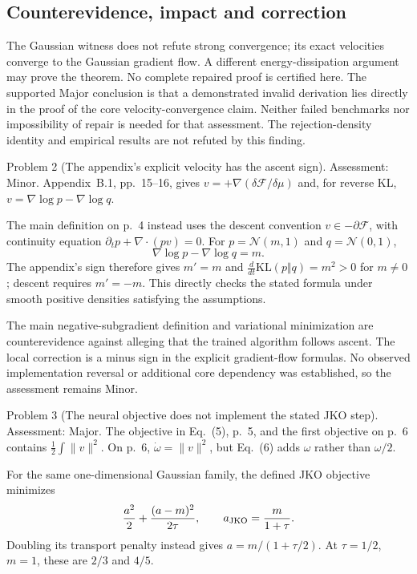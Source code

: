 \documentclass[10pt]{article}
\begin{document}
\subsection*{Counterevidence, impact and correction}
The Gaussian witness does not refute strong convergence; its exact velocities converge to the Gaussian gradient flow. A different energy-dissipation argument may prove the theorem. No complete repaired proof is certified here. The supported Major conclusion is that a demonstrated invalid derivation lies directly in the proof of the core velocity-convergence claim. Neither failed benchmarks nor impossibility of repair is needed for that assessment. The rejection-density identity and empirical results are not refuted by this finding.\par
Problem 2 (The appendix’s explicit velocity has the ascent sign).  Assessment: Minor. Appendix B.1, pp. 15–16, gives \(v=+\nabla(\delta\mathcal F/\delta\mu)\) and, for reverse KL, \(v=\nabla\log p-\nabla\log q\).\par
The main definition on p. 4 instead uses the descent convention \(v\in-\partial\mathcal F\), with continuity equation \(\partial_t p+\nabla\cdot(pv)=0\). For \(p=\mathcal N(m,1)\) and \(q=\mathcal N(0,1)\), \[\nabla\log p-\nabla\log q=m.\] The appendix’s sign therefore gives \(m'=m\) and \(\frac{d}{dt}\mathrm{KL}(p\Vert q)=m^2>0\) for \(m\ne0\); descent requires \(m'=-m\). This directly checks the stated formula under smooth positive densities satisfying the assumptions.\par
The main negative-subgradient definition and variational minimization are counterevidence against alleging that the trained algorithm follows ascent. The local correction is a minus sign in the explicit gradient-flow formulas. No observed implementation reversal or additional core dependency was established, so the assessment remains Minor.\par
Problem 3 (The neural objective does not implement the stated JKO step).  Assessment: Major. The objective in Eq. (5), p. 5, and the first objective on p. 6 contains \(\frac12\int\|v\|^2\). On p. 6, \(\dot\omega=\|v\|^2\), but Eq. (6) adds \(\omega\) rather than \(\omega/2\).\par
For the same one-dimensional Gaussian family, the defined JKO objective minimizes \[\frac{a^2}{2}+\frac{(a-m)^2}{2\tau},
 \qquad a_{\rm JKO}=\frac{m}{1+\tau}.\] Doubling its transport penalty instead gives \(a=m/(1+\tau/2)\). At \(\tau=1/2\), \(m=1\), these are \(2/3\) and \(4/5\).\par
\end{document}
